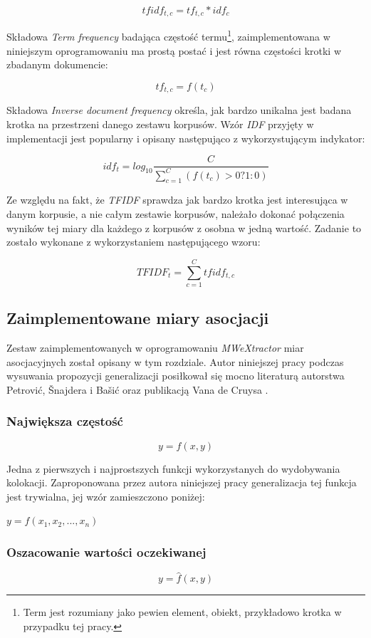 $$ tfidf_{t, c} = tf_{t, c} * idf_{c} $$

Składowa \emph{Term frequency} badająca częstość termu\footnote{Term jest rozumiany jako pewien element, obiekt, przykładowo krotka w przypadku tej pracy.}, zaimplementowana w niniejszym oprogramowaniu ma prostą postać i jest równa częstości krotki w zbadanym dokumencie:

$$ tf_{t,c} = f(t_{c}) $$

Składowa \emph{Inverse document frequency} określa, jak bardzo unikalna jest badana krotka na przestrzeni danego zestawu korpusów.
Wzór \emph{IDF} przyjęty w implementacji jest popularny i opisany następująco z wykorzystującym indykator:

$$ idf_{t} = log_{10} \frac{C}{\sum_{c=1}^{C} (f(t_{c}) > 0 ? 1 : 0) } $$

\par
Ze względu na fakt, że \emph{TFIDF} sprawdza jak bardzo krotka jest interesująca w danym korpusie, a nie całym zestawie korpusów, należało dokonać połączenia wyników tej miary dla każdego z korpusów z osobna w jedną wartość.
Zadanie to zostało wykonane z wykorzystaniem następującego wzoru:

$$ TFIDF_{t} = \sum_{c=1}^{C} tfidf_{t, c} $$


\subsection{Zaimplementowane miary asocjacji}
Zestaw zaimplementowanych w oprogramowaniu \emph{MWeXtractor} miar asocjacyjnych został opisany w tym rozdziale.
Autor niniejszej pracy podczas wysuwania propozycji generalizacji posiłkował się mocno literaturą autorstwa Petrović, Šnajdera i Bašić \cite{generalization_patterns} oraz publikacją Vana de Cruysa \cite{mmi_w11}.


\subsubsection{Największa częstość}
$$ y = f(x, y) $$

\par
Jedna z pierwszych i najprostszych funkcji wykorzystanych do wydobywania kolokacji.
Zaproponowana przez autora niniejszej pracy generalizacja tej funkcja jest trywialna, jej wzór zamieszczono poniżej:
\begin{center}
\( y = f(x_{1}, x_{2}, ..., x_{n}) \)
\end{center}

\subsubsection{Oszacowanie wartości oczekiwanej}
$$ y = \hat{f}(x, y) $$

